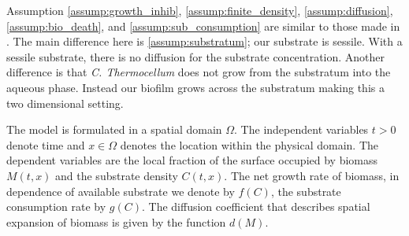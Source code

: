 Assumption \ref{assump:growth_inhib}, \ref{assump:finite_density}, \ref{assump:diffusion}, \ref{assump:bio_death}, and \ref{assump:sub_consumption} are similar to those made in \cite{eberl2001deterministic}.
The main difference here is \ref{assump:substratum}; our substrate is sessile.
With a sessile substrate, there is no diffusion for the substrate concentration.
Another difference is that \textit{C. Thermocellum} does not grow from the substratum into the aqueous phase.
Instead our biofilm grows across the substratum making this a two dimensional setting.

The model is formulated in a spatial domain $\Omega$. 
The independent variables $t > 0$ denote time and $x \in \Omega$ denotes the location within the physical domain.
The dependent variables are the local fraction of the surface occupied by biomass $M(t,x)$ and the substrate density $C(t,x)$.
The net growth rate of biomass, in dependence of available substrate we denote by $f(C)$, the substrate consumption rate by $g(C)$.
The diffusion coefficient that describes spatial expansion of biomass is given by the function $d(M)$.

